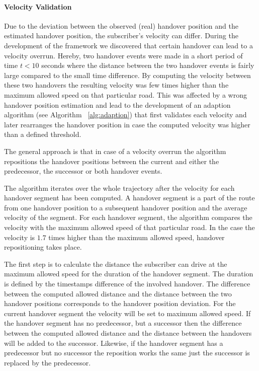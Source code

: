\paragraph{Velocity Validation}
Due to the deviation between the observed (real) handover position and the estimated handover position, the subscriber's velocity can differ. During the development of the framework we discovered that certain handover can lead to a velocity overrun. Hereby, two handover events were made in a short period of time $t<10$ seconds where the distance between the two handover events is fairly large compared to the small time difference. By computing the velocity between these two handovers the resulting velocity was few times higher than the maximum allowed speed on that particular road. This was affected by a wrong handover position estimation and lead to the development of an adaption algorithm (see Algorithm ~\ref{alg:adaption}) that first validates each velocity and later rearranges the handover position in case the computed velocity was higher than a defined threshold. 

The general approach is that in case of a velocity overrun the algorithm repositions the handover positions between the current and either the predecessor, the successor or both handover events.

The algorithm iterates over the whole trajectory after the velocity for each handover segment has been computed. A handover segment is a part of the route from one handover position to a subsequent handover position and the average velocity of the segment. For each handover segment, the algorithm compares the velocity with the maximum allowed speed of that particular road. In the case the velocity is $1.7$ times higher than the maximum allowed speed, handover repositioning takes place. 

The first step is to calculate the distance the subscriber can drive at the maximum allowed speed for the duration of the handover segment. The duration is defined by the timestamps difference of the involved handover. The difference between the computed allowed distance and the distance between the two handover positions corresponds to the handover position deviation. For the current handover segment the velocity will be set to maximum allowed speed. If the handover segment has no predecessor, but a successor then the difference between the computed allowed distance and the distance between the handovers will be added to the successor. Likewise, if the handover segment has a predecessor but no successor the reposition works the same just the successor is replaced by the predecessor. 

